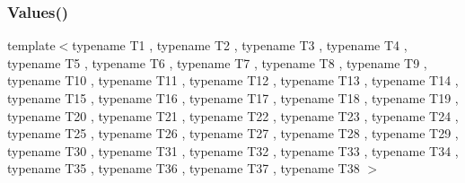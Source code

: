\mbox{\label{namespacetesting_aabc33ee31d17eb0b0bed3401d62266d9}} 
\subsubsection{\texorpdfstring{Values()}{Values()}\hspace{0.1cm}{\footnotesize\ttfamily [39/51]}}
{\footnotesize\ttfamily template$<$typename T1 , typename T2 , typename T3 , typename T4 , typename T5 , typename T6 , typename T7 , typename T8 , typename T9 , typename T10 , typename T11 , typename T12 , typename T13 , typename T14 , typename T15 , typename T16 , typename T17 , typename T18 , typename T19 , typename T20 , typename T21 , typename T22 , typename T23 , typename T24 , typename T25 , typename T26 , typename T27 , typename T28 , typename T29 , typename T30 , typename T31 , typename T32 , typename T33 , typename T34 , typename T35 , typename T36 , typename T37 , typename T38 $>$ \\
}

